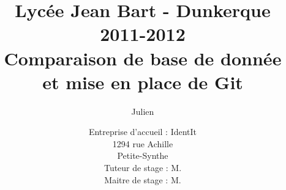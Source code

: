 \documentclass[12pt,a4paper]{report}
\title
{
	\normalsize{Lycée Jean Bart - Dunkerque\\
	2011-2012}\\
	\vspace{15mm}
	\Huge{Comparaison de base de donnée\\
    et mise en place de Git\\
    \vspace{15mm}}
}
\author{\bsc{Stechele} Julien\\
	\vspace{45mm}
}
\date{
	\normalsize{Entreprise d'accueil : IdentIt\\
    1294 rue Achille \bsc{Pérès}\\
	Petite-Synthe\\
	\vspace{5mm}
    Tuteur de stage : M.\bsc{Anselin}\\
	Maitre de stage : M.\bsc{Dubourg}
	}
}
\begin{document}
\maketitle

\begin{onehalfspace}



\renewcommand{\contentsname}{Sommaire}

\tableofcontents









\end{onehalfspace}
\end{document}

